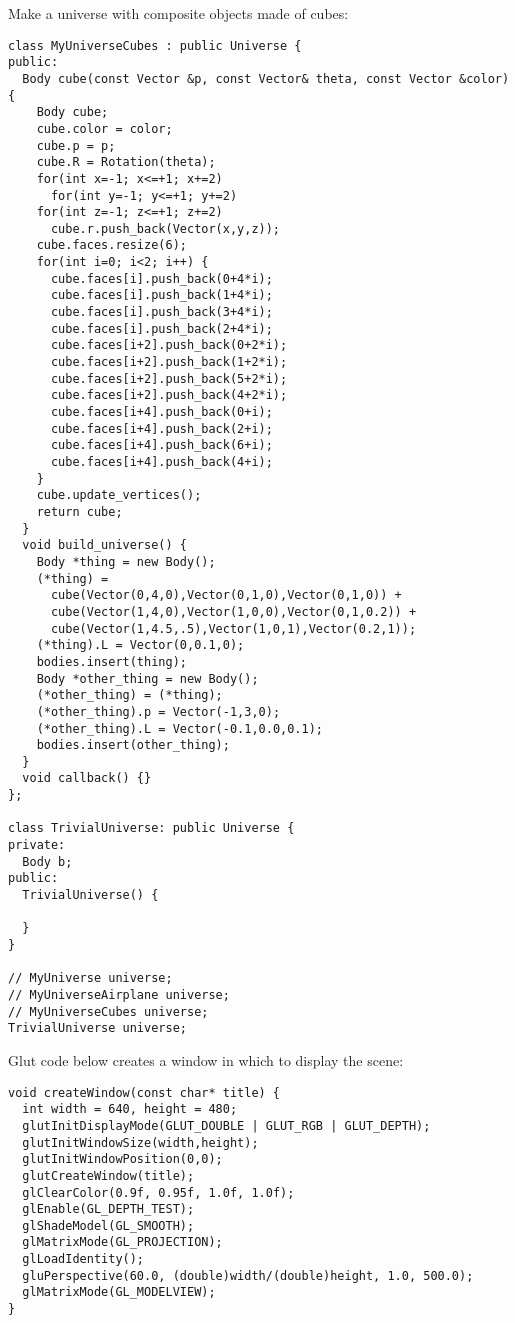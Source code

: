 \noindent
Make a universe with composite objects made of cubes: \begin{lstlisting}
class MyUniverseCubes : public Universe {
public:
  Body cube(const Vector &p, const Vector& theta, const Vector &color) {
    Body cube;
    cube.color = color;
    cube.p = p;
    cube.R = Rotation(theta);
    for(int x=-1; x<=+1; x+=2)
      for(int y=-1; y<=+1; y+=2)
	for(int z=-1; z<=+1; z+=2)
	  cube.r.push_back(Vector(x,y,z));
    cube.faces.resize(6);    
    for(int i=0; i<2; i++) {
      cube.faces[i].push_back(0+4*i);
      cube.faces[i].push_back(1+4*i);
      cube.faces[i].push_back(3+4*i);
      cube.faces[i].push_back(2+4*i);
      cube.faces[i+2].push_back(0+2*i);
      cube.faces[i+2].push_back(1+2*i);
      cube.faces[i+2].push_back(5+2*i);
      cube.faces[i+2].push_back(4+2*i);
      cube.faces[i+4].push_back(0+i);
      cube.faces[i+4].push_back(2+i);
      cube.faces[i+4].push_back(6+i);
      cube.faces[i+4].push_back(4+i);
    }
    cube.update_vertices();
    return cube;
  }
  void build_universe() {
    Body *thing = new Body();
    (*thing) = 
      cube(Vector(0,4,0),Vector(0,1,0),Vector(0,1,0)) +
      cube(Vector(1,4,0),Vector(1,0,0),Vector(0,1,0.2)) +
      cube(Vector(1,4.5,.5),Vector(1,0,1),Vector(0.2,1));		    
    (*thing).L = Vector(0,0.1,0);    
    bodies.insert(thing);
    Body *other_thing = new Body();
    (*other_thing) = (*thing);
    (*other_thing).p = Vector(-1,3,0);
    (*other_thing).L = Vector(-0.1,0.0,0.1);
    bodies.insert(other_thing);    
  }
  void callback() {}
};

class TrivialUniverse: public Universe {
private:
  Body b;
public:
  TrivialUniverse() {
    
  }
}

// MyUniverse universe;
// MyUniverseAirplane universe;
// MyUniverseCubes universe;
TrivialUniverse universe;
\end{lstlisting}
\noindent
Glut code below
creates a window in which to display the scene: \begin{lstlisting}
void createWindow(const char* title) {
  int width = 640, height = 480;
  glutInitDisplayMode(GLUT_DOUBLE | GLUT_RGB | GLUT_DEPTH);
  glutInitWindowSize(width,height);
  glutInitWindowPosition(0,0);
  glutCreateWindow(title);
  glClearColor(0.9f, 0.95f, 1.0f, 1.0f);
  glEnable(GL_DEPTH_TEST);
  glShadeModel(GL_SMOOTH);  
  glMatrixMode(GL_PROJECTION);
  glLoadIdentity();
  gluPerspective(60.0, (double)width/(double)height, 1.0, 500.0);
  glMatrixMode(GL_MODELVIEW);
}
\end{lstlisting}
